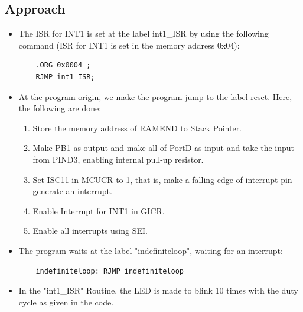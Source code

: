 \documentclass[titlepage, 11pt]{article}
\begin{document}
\subsection{Approach}
\begin{itemize}
\item The ISR for INT1 is set at the label int1\_ISR by using the following command (ISR for INT1 is set in the memory address 0x04):
{\renewcommand\fcolorbox[4][]{\textcolor{black}{\strut#4}}
\begin{verbatim}
    .ORG 0x0004 ;
    RJMP int1_ISR;
\end{verbatim}
}

\item At the program origin, we make the program jump to the label reset. Here, the following are done:

    \begin{enumerate}
        \item Store the memory address of RAMEND to Stack Pointer.
        \item Make PB1 as output and make all of PortD as input and take the input from PIND3, enabling internal pull-up resistor.
        \item Set ISC11 in MCUCR to 1, that is, make a falling edge of interrupt pin generate an interrupt.
        \item Enable Interrupt for INT1 in GICR.
        \item Enable all interrupts using SEI.
    \end{enumerate}

\item The program waits at the label "indefiniteloop", waiting for an interrupt:
    {\renewcommand\fcolorbox[4][]{\textcolor{black}{\strut#4}}
    \begin{verbatim}
    indefiniteloop: RJMP indefiniteloop
    \end{verbatim}
}

\item In the "int1\_ISR" Routine, the LED is made to blink 10 times with the duty cycle as given in the code.
\end{itemize}
\end{document}
